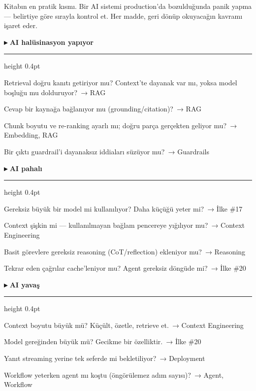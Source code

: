 

Kitabın en pratik kısmı. Bir AI sistemi production'da bozulduğunda panik yapma ---
belirtiye göre sırayla kontrol et. Her madde, geri dönüp okuyacağın kavramı işaret eder.

\newcommand{\symptom}[1]{%
  \vspace{7pt}\par\noindent
  {\sffamily\bfseries\small\color{warn}▸ }{\sffamily\bfseries\small\color{ink}#1}%
  \hspace{4pt}\textcolor{hairline}{\leaders\hrule height 0.4pt\hfill}\par
  \vspace{1pt}}
\newcommand{\chk}[2]{%
  \par\vspace{1.5pt}\noindent\hangindent=7mm\hangafter=0
  \makebox[6mm][l]{\sffamily\bfseries\footnotesize\color{accent}#1}%
  #2\par}

\symptom{AI halüsinasyon yapıyor}
\chk{1}{Retrieval doğru kanıtı getiriyor mu? Context'te dayanak var mı, yoksa model boşluğu mu dolduruyor? \,{\scriptsize\color{softgray}→ RAG}}
\chk{2}{Cevap bir kaynağa bağlanıyor mu (grounding/citation)? \,{\scriptsize\color{softgray}→ RAG}}
\chk{3}{Chunk boyutu ve re-ranking ayarlı mı; doğru parça gerçekten geliyor mu? \,{\scriptsize\color{softgray}→ Embedding, RAG}}
\chk{4}{Bir çıktı guardrail'i dayanaksız iddiaları süzüyor mu? \,{\scriptsize\color{softgray}→ Guardrails}}

\symptom{AI pahalı}
\chk{1}{Gereksiz büyük bir model mi kullanılıyor? Daha küçüğü yeter mi? \,{\scriptsize\color{softgray}→ İlke \#17}}
\chk{2}{Context şişkin mi --- kullanılmayan bağlam pencereye yığılıyor mu? \,{\scriptsize\color{softgray}→ Context Engineering}}
\chk{3}{Basit görevlere gereksiz reasoning (CoT/reflection) ekleniyor mu? \,{\scriptsize\color{softgray}→ Reasoning}}
\chk{4}{Tekrar eden çağrılar cache'leniyor mu? Agent gereksiz döngüde mi? \,{\scriptsize\color{softgray}→ İlke \#20}}

\symptom{AI yavaş}
\chk{1}{Context boyutu büyük mü? Küçült, özetle, retrieve et. \,{\scriptsize\color{softgray}→ Context Engineering}}
\chk{2}{Model gereğinden büyük mü? Gecikme bir özelliktir. \,{\scriptsize\color{softgray}→ İlke \#20}}
\chk{3}{Yanıt streaming yerine tek seferde mi bekletiliyor? \,{\scriptsize\color{softgray}→ Deployment}}
\chk{4}{Workflow yeterken agent mı koştu (öngörülemez adım sayısı)? \,{\scriptsize\color{softgray}→ Agent, Workflow}}

